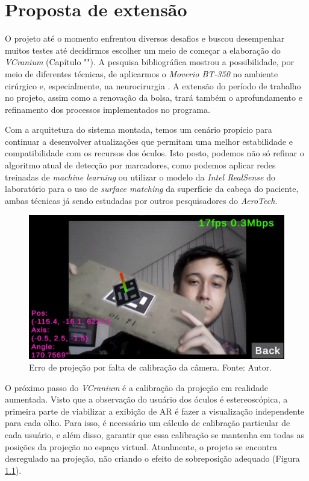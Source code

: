 \chapter{Proposta de extensão}\label{chp:extensao}

O projeto até o momento enfrentou diversos desafios e buscou desempenhar muitos testes até decidirmos escolher um meio de começar a elaboração do \textit{VCranium} (Capítulo ""). A pesquisa bibliográfica mostrou a possibilidade, por meio de diferentes técnicas, de aplicarmos o \textit{Moverio BT-350} no ambiente cirúrgico e, especialmente, na neurocirurgia \cite{Cho2020}. A extensão do período de trabalho no projeto, assim como a renovação da bolsa, trará também o aprofundamento e refinamento dos processos implementados no programa.

Com a arquitetura do sistema montada, temos um cenário propício para continuar a desenvolver atualizações que permitam uma melhor estabilidade e compatibilidade com os recursos dos óculos. Isto posto, podemos não só refinar o algoritmo atual de detecção por marcadores, como podemos aplicar redes treinadas de \textit{machine learning} ou utilizar o modelo da \textit{Intel RealSense} do laboratório para o uso de \textit{surface matching} da superfície da cabeça do paciente, ambas técnicas já sendo estudadas por outros pesquisadores do \textit{AeroTech}.

\begin{figure}[ht]
    \centering
    \includegraphics[width=.6\linewidth]{figuras/vcranium_calibration.png}
    \caption{Erro de projeção por falta de calibração da câmera. Fonte: Autor.}
    \label{fig:vcranium-calibration}
\end{figure}

O próximo passo do \textit{VCranium} é a calibração da projeção em realidade aumentada. Visto que a observação do usuário dos óculos é estereoscópica, a primeira parte de viabilizar a exibição de AR é fazer a visualização independente para cada olho. Para isso, é necessário um cálculo de calibração particular de cada usuário, e além disso, garantir que essa calibração se mantenha em todas as posições da projeção no espaço virtual. Atualmente, o projeto se encontra desregulado na projeção, não criando o efeito de sobreposição adequado (Figura \ref{fig:vcranium-calibration}).

